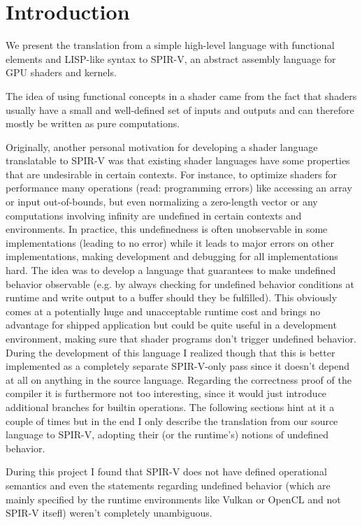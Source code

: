 \documentclass[letterpaper,12pt]{article}
\begin{document}
\section{Introduction}

We present the translation from a simple high-level language with
functional elements and LISP-like syntax to SPIR-V, an abstract
assembly language for GPU shaders and kernels.

The idea of using functional concepts in a shader came from the fact
that shaders usually have a small and well-defined set of inputs
and outputs and can therefore mostly be written as pure computations.

Originally, another personal motivation for developing a shader language
translatable to SPIR-V was that existing shader languages have some properties
that are undesirable in certain contexts. For instance, to optimize
shaders for performance many operations
(read: programming errors) like accessing an array or input out-of-bounds, but
even normalizing a zero-length vector or any computations involving infinity
are undefined in certain contexts and environments. In practice, this
undefinedness is often unobservable in some implementations (leading to no
error) while it leads to major errors on other implementations, making development 
and debugging for all implementations hard.
The idea was to develop a language that guarantees to
make undefined behavior observable (e.g. by always checking for undefined
behavior conditions at runtime and write output to a buffer should
they be fulfilled). This obviously comes at a potentially huge and
unacceptable runtime cost and brings no advantage for shipped application
but could be quite useful in a development environment, making sure
that shader programs don't trigger undefined behavior.
During the development of this language I realized though that this
is better implemented as a completely separate SPIR-V-only pass since it
doesn't depend at all on anything in the source language. Regarding
the correctness proof of the compiler it is furthermore not too interesting,
since it would just introduce additional branches for builtin operations.
The following sections hint at it a couple of times but in the end I only describe
the translation from our source language to SPIR-V, adopting their
(or the runtime's) notions of undefined behavior.

During this project I found that SPIR-V does not have defined operational
semantics and even the statements regarding undefined behavior (which are
mainly specified by the runtime environments like Vulkan or OpenCL
and not SPIR-V itsefl) weren't completely unambiguous.
\end{document}
